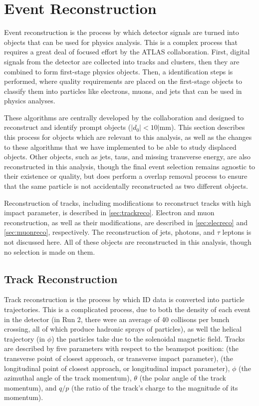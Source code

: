 \chapter{Event Reconstruction}
\label{ch:EventReconstruction}

Event reconstruction is the process by which detector signals are turned into objects that can be used for physics analysis. This is a complex process that requires a great deal of focused effort by the \ac{ATLAS} collaboration. First, digital signals from the detector are collected into tracks and clusters, then they are combined to form first-stage physics objects. Then, a identification steps is performed, where quality requirements are placed on the first-stage objects to classify them into particles like electrons, muons, and jets that can be used in physics analyses. 

These algorithms are centrally developed by the collaboration and designed to reconstruct and identify prompt objects ($|d_{0}| < 10| \textrm{mm}$). This section describes this process for objects which are relevant to this analysis, as well as the changes to these algorithms that we have implemented to be able to study displaced objects. Other objects, such as jets, taus, and missing transverse energy, are also reconstructed in this analysis, though the final event selection remains agnostic to their existence or quality, but does perform a overlap removal process to ensure that the same particle is not accidentally reconstructed as two different objects. 

Reconstruction of tracks, including modifications to reconstruct tracks with high impact parameter, is described in \autoref{sec:trackreco}. Electron and muon reconstruction, as well as their modifications, are described in \autoref{sec:elecreco} and \autoref{sec:muonreco}, respectively. The reconstruction of jets, photons, and $\tau$ leptons is not discussed here. All of these objects are reconstructed in this analysis, though no selection is made on them. 


\section{Track Reconstruction}
\label{sec:trackreco}

Track reconstruction is the process by which \ac{ID} data is converted into particle trajectories. This is a complicated process, due to both the density of each event in the detector (in Run 2, there were an average of 40 collisons per bunch crossing, all of which produce hadronic sprays of particles), as well the helical trajectory (in $\phi$) the particles take due to the solenoidal magnetic field. Tracks are described by five parameters with respect to the beamspot position: \dzero (the transverse point of closest approach, or transverse impact parameter), \zzero (the longitudinal point of closest approach, or longitudinal impact parameter), $\phi$ (the azimuthal angle of the track momentum), $\theta$ (the polar angle of the track momentum), and $q/p$ (the ratio of the track's charge to the magnitude of its momentum).



